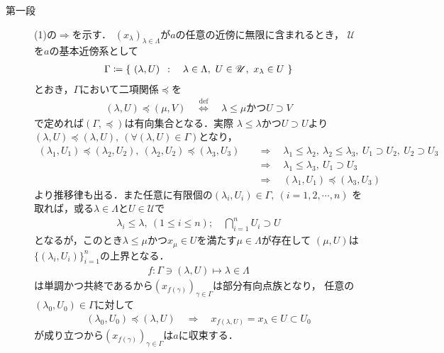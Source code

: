 	\begin{prf}\mbox{}
		\begin{description}
			\item[第一段] (1)の$\Longrightarrow$を示す．
				$(x_\lambda)_{\lambda \in \Lambda}$が$a$の任意の近傍に無限に含まれるとき，
				$\mathscr{U}$を$a$の基本近傍系として
				\begin{align}
					\Gamma \coloneqq \left\{\ (\lambda,U)\ \, : \quad \lambda \in \Lambda,\ U \in \mathscr{U},\ x_\lambda \in U\ \right\}
				\end{align}
				とおき，$\Gamma$において二項関係$\preceq$を
				\begin{align}
					(\lambda,U) \preceq (\mu,V) 
					\quad \overset{\mathrm{def}}{\Longleftrightarrow} \quad
					\mbox{$\lambda \leq \mu$かつ$U \supset V$}
				\end{align}
				で定めれば$(\Gamma,\preceq)$は有向集合となる．実際
				$\lambda \leq \lambda$かつ$U \supset U$より
				$(\lambda,U) \preceq (\lambda,U),\ (\forall (\lambda,U) \in \Gamma)$となり，
				\begin{align}
					(\lambda_1,U_1) \preceq (\lambda_2,U_2),\
					(\lambda_2,U_2) \preceq (\lambda_3,U_3) 
					&\quad \Longrightarrow \quad
					\lambda_1 \leq \lambda_2,\ \lambda_2 \leq \lambda_3,
					\ U_1 \supset U_2,\ U_2 \supset U_3 \\
					&\quad \Longrightarrow \quad
					\lambda_1 \leq \lambda_3,\ U_1 \supset U_3 \\
					&\quad \Longrightarrow \quad
					(\lambda_1,U_1) \preceq (\lambda_3,U_3)
				\end{align}
				より推移律も出る．また任意に有限個の$(\lambda_i,U_i) \in \Gamma,\ (i=1,2,\cdots,n)$
				を取れば，或る$\lambda \in \Lambda$と$U \in \mathscr{U}$で
				\begin{align}
					\lambda_i \leq \lambda,\ (1 \leq i \leq n);
					\quad \bigcap_{i=1}^n U_i \supset U
				\end{align}
				となるが，このとき$\lambda \leq \mu$かつ$x_\mu \in U$を満たす$\mu \in \Lambda$が存在して
				$(\mu,U)$は$\{(\lambda_i,U_i)\}_{i=1}^n$の上界となる．
				\begin{align}
					f:\Gamma \ni (\lambda,U) \longmapsto \lambda \in \Lambda
				\end{align}
				は単調かつ共終であるから$(x_{f(\gamma)})_{\gamma \in \Gamma}$は部分有向点族となり，
				任意の$(\lambda_0,U_0) \in \Gamma$に対して
				\begin{align}
					(\lambda_0,U_0) \preceq (\lambda,U)
					\quad \Longrightarrow \quad
					x_{f(\lambda,U)} = x_\lambda \in U \subset U_0
				\end{align}
				が成り立つから$(x_{f(\gamma)})_{\gamma \in \Gamma}$は$a$に収束する．
			

\end{description}
\end{prf}
